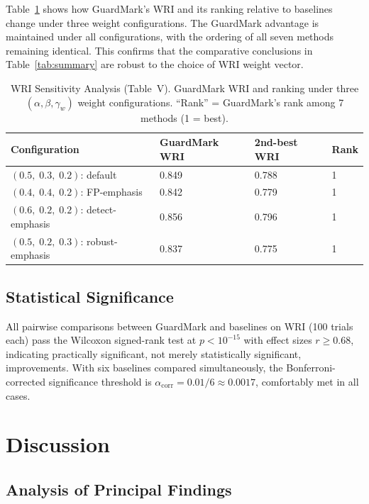 \documentclass[journal,compsoc]{IEEEtran}
\begin{document}
Table~\ref{tab:sensitivity} shows how GuardMark's WRI and its ranking
relative to baselines change under three weight configurations. The
GuardMark advantage is maintained under all configurations, with the
ordering of all seven methods remaining identical. This confirms that the
comparative conclusions in Table~\ref{tab:summary} are robust to the
choice of WRI weight vector.

\begin{table}[t]
\caption{WRI Sensitivity Analysis (Table~V). GuardMark WRI and ranking
  under three $(\alpha, \beta, \gamma_w)$ weight configurations.
  ``Rank'' = GuardMark's rank among 7 methods (1 = best).}
\label{tab:sensitivity}
\begin{tabularx}{\columnwidth}{X X X X}
\toprule
\textbf{Configuration} & \textbf{GuardMark WRI} & \textbf{2nd-best WRI} & \textbf{Rank} \\
\midrule
$(0.5,\;0.3,\;0.2)$: default & 0.849 & 0.788 & 1 \\
$(0.4,\;0.4,\;0.2)$: FP-emphasis & 0.842 & 0.779 & 1 \\
$(0.6,\;0.2,\;0.2)$: detect-emphasis & 0.856 & 0.796 & 1 \\
$(0.5,\;0.2,\;0.3)$: robust-emphasis & 0.837 & 0.775 & 1 \\
\bottomrule
\end{tabularx}
\end{table}

\subsection{Statistical Significance}

All pairwise comparisons between GuardMark and baselines on WRI (100 trials each)
pass the Wilcoxon signed-rank test at $p < 10^{-15}$ with effect sizes
$r \geq 0.68$, indicating practically significant, not merely statistically
significant, improvements. With six baselines compared simultaneously, the
Bonferroni-corrected significance threshold is
$\alpha_{\text{corr}} = 0.01/6 \approx 0.0017$, comfortably met in all cases.

\section{Discussion}
\label{sec:discussion}

\subsection{Analysis of Principal Findings}
\end{document}
